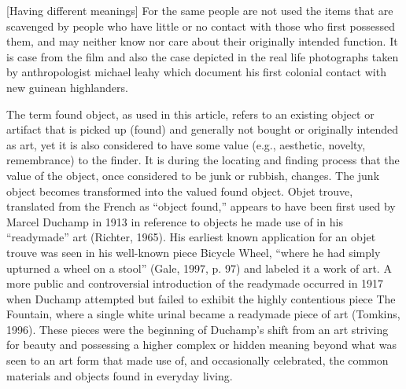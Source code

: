 [Having different meanings] For the same people are not used the items that are scavenged by people who have little or no contact with those who first possessed them, and may neither know nor care about their originally intended function. It is case from the film and also the case depicted in the real life photographs taken by anthropologist michael leahy which document his first colonial contact with new guinean highlanders.

 





The term found object, as used in this article, refers to an existing object or artifact that is picked up (found) and generally not bought or originally intended as art, yet it is also considered to have some value (e.g., aesthetic, novelty, remembrance) to the finder. It is during the locating and finding process that the value of the object, once considered to be junk or rubbish, changes. The junk object becomes transformed into the valued found object. Objet trouve, translated from the French as “object found,” appears to have been first used by Marcel Duchamp in 1913 in reference to objects he made use of in his “readymade” art (Richter, 1965). His earliest known application for an objet trouve was seen in his well-known piece Bicycle Wheel, “where he had simply upturned a wheel on a stool” (Gale, 1997, p. 97) and labeled it a work of art. A more public and controversial introduction of the readymade occurred in 1917 when Duchamp attempted but failed to exhibit the highly contentious piece The Fountain, where a single white urinal became a readymade piece of art (Tomkins, 1996). These pieces were the beginning of Duchamp’s shift from an art striving for beauty and possessing a higher complex or hidden meaning beyond what was seen to an art form that made use of, and occasionally celebrated, the common materials and objects found in everyday living.

